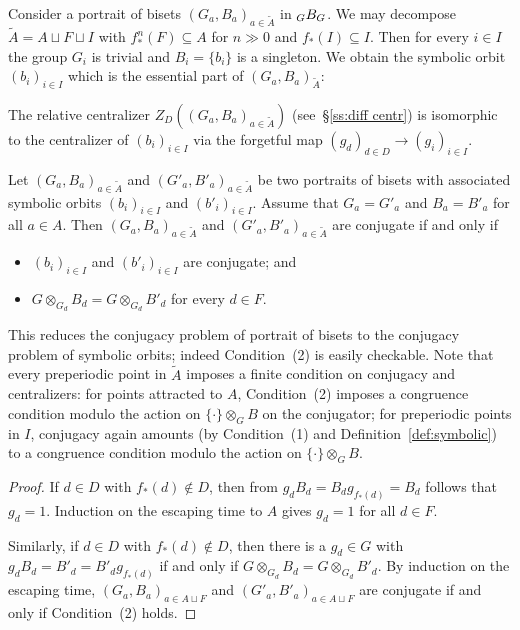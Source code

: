 \documentclass{amsart}
\newcommand\wtA{{\widetilde A}}
\begin{document}
Consider a portrait of bisets $(G_a,B_a)_{a\in \wtA}$ in
$\subscript G B_G$. We may decompose $\wtA=A\sqcup F\sqcup I$
with $f_*^n(F)\subseteq A$ for $n\gg0$ and $f_*(I)\subseteq I$. Then for every
$i\in I$ the group $G_i$ is trivial and $B_i=\{b_i\}$ is a
singleton. We obtain the symbolic orbit $(b_i)_{i\in I}$ which is the
essential part of $(G_a,B_a)_{\wtA}$:
\begin{lem}\label{lem:Zportrait=Zhpo}
  The relative centralizer $Z_D((G_a,B_a)_{a\in \wtA})$
  (see~\S\ref{ss:diff centr}) is isomorphic to the centralizer of
  $(b_i)_{i\in I}$ via the forgetful map
  $(g_{d})_{d\in D}\to (g_i)_{i\in I}$.

  Let $(G_a,B_a)_{a\in \wtA}$ and
  $(G'_a,B'_a)_{a\in \wtA}$ be two portraits of bisets with
  associated symbolic orbits $(b_i)_{i\in I}$ and $(b'_i)_{i\in
    I}$. Assume that $G_a=G'_a$ and $B_a=B'_a$ for all $a\in A$. Then
  $(G_a,B_a)_{a\in \wtA}$ and
  $(G'_a,B'_a)_{a\in \wtA}$ are conjugate if and only if
  \begin{itemize}
  \item[(1)] $(b_i)_{i\in I}$ and $(b'_i)_{i\in I}$ are conjugate; and
  \item[(2)] $G\otimes_{G_d} B_d=G\otimes_{G_d} B'_d$ for every
    $d\in F$.
  \end{itemize}
\end{lem}
This reduces the conjugacy problem of portrait of bisets to the
conjugacy problem of symbolic orbits; indeed Condition~(2) is easily
checkable. Note that every preperiodic point in $\wtA$ imposes a
finite condition on conjugacy and centralizers: for points attracted
to $A$, Condition~(2) imposes a congruence condition modulo the action
on $\{\cdot\}\otimes_G B$ on the conjugator; for preperiodic points in
$I$, conjugacy again amounts (by Condition~(1) and
Definition~\ref{def:symbolic}) to a congruence condition modulo the
action on $\{\cdot\}\otimes_G B$.
\begin{proof}
  If $d\in D$ with $f_*(d)\not\in D$, then from
  $g_d B_d=B_d g_{f_*(d)}=B_d$ follows that $g_d=1$. Induction on
  the escaping time to $A$ gives $g_d=1$ for all $d\in F$.

  Similarly, if $d\in D$ with $f_*(d)\not\in D$, then there is a
  $g_d\in G$ with $g_d B_d=B'_d= B'_d g_{f_*(d)}$ if and only if
  $G\otimes_{G_d} B_d=G\otimes_{G_d} B'_d$.  By induction on the
  escaping time, $(G_a,B_a)_{a\in A\sqcup F}$ and
  $(G'_a,B'_a)_{a\in A\sqcup F}$ are conjugate if and only if
  Condition~(2) holds.
\end{proof}
\end{document}

